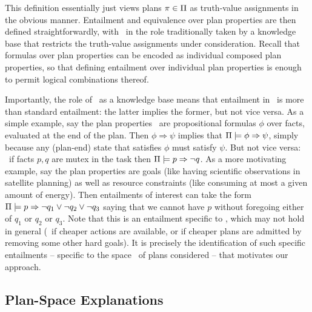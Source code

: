 This definition essentially just views plans $\pi \in \Pi$ as
truth-value assignments in the obvious manner. Entailment and
equivalence over plan properties are then defined straightforwardly,
with \plans\ in the role traditionally taken by a knowledge base that
restricts the truth-value assignments under consideration. Recall that
formulas over plan properties can be encoded as individual composed
plan properties, so that defining entailment over individual plan
properties is enough to permit logical combinations thereof.

Importantly, the role of \plans\ as a knowledge base means that
entailment in \plans\ is more than standard entailment: the latter
implies the former, but not vice versa. As a simple example, say the
plan properties \props\ are propositional formulas $\phi$ over facts,
evaluated at the end of the plan. Then $\phi \Rightarrow \psi$ implies
that $\Pi \models \phi \Rightarrow \psi$, simply because any (plan-end)
state that satisfies $\phi$ must satisfy $\psi$. But not vice versa:
\eg\ if facts $p, q$ are mutex in the task then
$\Pi \models p \Rightarrow \neg q$. As a more motivating example, say the
plan properties are goals (like having scientific observations in
satellite planning) as well as resource constraints (like consuming at
most a given amount of energy). Then entailments of interest can take
the form $\Pi \models p \Rightarrow \neg q_1 \vee \neg q_2 \vee \neg q_3$
saying that we cannot have $p$ without foregoing either of $q_1$ or
$q_2$ or $q_3$. Note that this is an entailment specific to \plans,
which may not hold in general (\eg\ if cheaper actions are available,
or if cheaper plans are admitted by removing some other hard
goals). It is precisely the identification of such specific
entailments -- specific to the space \plans\ of plans considered --
that motivates our approach.





\subsection{Plan-Space Explanations}

